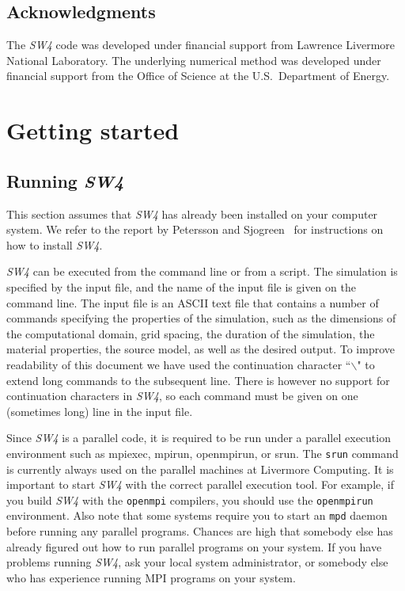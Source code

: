 \documentclass[11pt]{report}
\begin{document}
\section{Acknowledgments} 
The \emph{SW4} code was developed under financial support from Lawrence Livermore National
Laboratory. The underlying numerical method was developed under financial support from
the Office of Science at the U.S.~Department of Energy.


\chapter{Getting started}

\section{Running \emph{SW4}}
This section assumes that \emph{SW4} has already been installed on your computer system. We refer to
the report by Petersson and Sjogreen~\cite{SW4-install} for instructions on how to install
\emph{SW4}.

\emph{SW4} can be executed from the command line or from a script. The simulation is specified by
the input file, and the name of the input file is given on the command line. The input file is an
ASCII text file that contains a number of commands specifying the properties of the simulation, such
as the dimensions of the computational domain, grid spacing, the duration of the simulation, the
material properties, the source model, as well as the desired output. To improve readability of this
document we have used the continuation character ``$\backslash$" to extend long commands to the
subsequent line. There is however no support for continuation characters in \emph{SW4}, so each
command must be given on one (sometimes long) line in the input file.

Since \emph{SW4} is a parallel code, it is required to be run under a parallel execution environment
such as mpiexec, mpirun, openmpirun, or srun. The \verb+srun+ command is currently always used on
the parallel machines at Livermore Computing. It is important to start \emph{SW4} with the correct
parallel execution tool. For example, if you build \emph{SW4} with the \verb+openmpi+ compilers, you
should use the \verb+openmpirun+ environment. Also note that some systems require you to start an
\verb+mpd+ daemon before running any parallel programs. Chances are high that somebody else has
already figured out how to run parallel programs on your system. If you have problems running
\emph{SW4}, ask your local system administrator, or somebody else who has experience running MPI
programs on your system.
\end{document}
